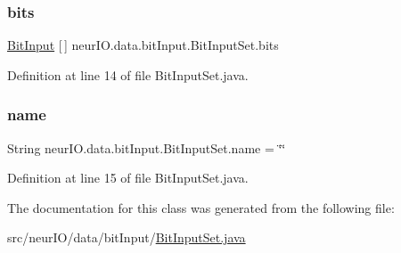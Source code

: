 \subsubsection{\texorpdfstring{bits}{bits}}
{\footnotesize\ttfamily \hyperlink{classneur_i_o_1_1data_1_1bit_input_1_1_bit_input}{Bit\+Input} \mbox{[}$\,$\mbox{]} neur\+I\+O.\+data.\+bit\+Input.\+Bit\+Input\+Set.\+bits}



Definition at line 14 of file Bit\+Input\+Set.\+java.

\mbox{\label{classneur_i_o_1_1data_1_1bit_input_1_1_bit_input_set_ae983698847d96bf735ee7379114a0cbc}} 
\subsubsection{\texorpdfstring{name}{name}}
{\footnotesize\ttfamily String neur\+I\+O.\+data.\+bit\+Input.\+Bit\+Input\+Set.\+name = \char`\"{}\char`\"{}}



Definition at line 15 of file Bit\+Input\+Set.\+java.



The documentation for this class was generated from the following file\+:\begin{DoxyCompactItemize}
\item 
src/neur\+I\+O/data/bit\+Input/\hyperlink{_bit_input_set_8java}{Bit\+Input\+Set.\+java}\end{DoxyCompactItemize}
